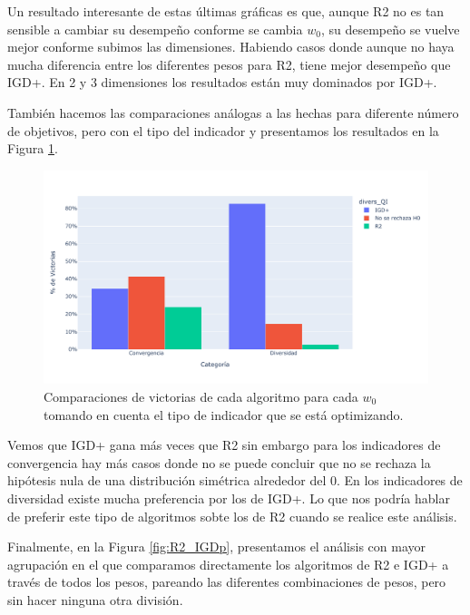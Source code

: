 Un resultado interesante de estas últimas gráficas es que, aunque R2 no es tan sensible a cambiar su desempeño conforme se cambia $w_0$, su desempeño se vuelve mejor conforme subimos las dimensiones. Habiendo casos donde aunque no haya mucha diferencia entre los diferentes pesos para R2, tiene mejor desempeño que IGD+. En 2 y 3 dimensiones los resultados están muy dominados por IGD+. 

También hacemos las comparaciones análogas a las hechas para diferente número de objetivos, pero con el tipo del indicador y presentamos los resultados en la Figura \ref{fig:R2_IGDp_cat}.


\begin{figure}[H]
    \centering
    \includegraphics[width=\textwidth]{Figuras/R2_vs_IGDp_por_tipo_ind.pdf}
    \caption[R2 vs IGD+, victorias por indicador.]{Comparaciones de victorias de cada algoritmo para cada $w_0$ tomando en cuenta el tipo de indicador que se está optimizando.}
    \label{fig:R2_IGDp_cat}
\end{figure}


Vemos que IGD+ gana más veces que R2 sin embargo para los indicadores de convergencia hay más casos donde no se puede concluir que no se rechaza la hipótesis nula de una distribución simétrica alrededor del 0. En los indicadores de diversidad existe mucha preferencia por los de IGD+. Lo que nos podría hablar de preferir este tipo de algoritmos sobte los de R2 cuando se realice este análisis. 


Finalmente, en la Figura \ref{fig:R2_IGDp}, presentamos el análisis con mayor agrupación en el que comparamos directamente los algoritmos de R2 e IGD+ a través de todos los pesos, pareando las diferentes combinaciones de pesos, pero sin hacer ninguna otra división. 


